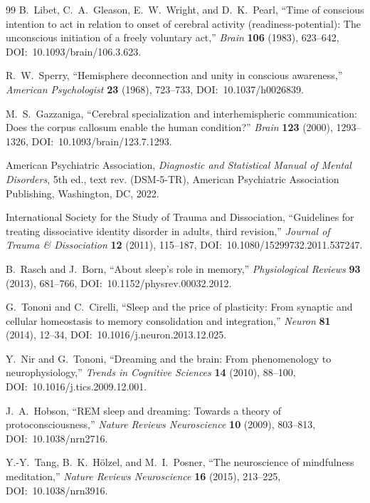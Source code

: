 \documentclass[12pt]{article}
\theoremstyle{definition}
\theoremstyle{remark}
\begin{document}
\begin{thebibliography}{99}
B.~Libet, C.~A.~Gleason, E.~W.~Wright, and D.~K.~Pearl,
``Time of conscious intention to act in relation to onset of cerebral
activity (readiness-potential): The unconscious initiation of a freely
voluntary act,''
\emph{Brain} \textbf{106} (1983), 623--642,
DOI:~10.1093/brain/106.3.623.

R.~W.~Sperry,
``Hemisphere deconnection and unity in conscious awareness,''
\emph{American Psychologist} \textbf{23} (1968), 723--733,
DOI:~10.1037/h0026839.

M.~S.~Gazzaniga,
``Cerebral specialization and interhemispheric communication: Does the
corpus callosum enable the human condition?''
\emph{Brain} \textbf{123} (2000), 1293--1326,
DOI:~10.1093/brain/123.7.1293.

American Psychiatric Association,
\emph{Diagnostic and Statistical Manual of Mental Disorders},
5th ed., text rev. (DSM-5-TR),
American Psychiatric Association Publishing, Washington, DC, 2022.

International Society for the Study of Trauma and Dissociation,
``Guidelines for treating dissociative identity disorder in adults,
third revision,''
\emph{Journal of Trauma \& Dissociation} \textbf{12} (2011), 115--187,
DOI:~10.1080/15299732.2011.537247.

B.~Rasch and J.~Born,
``About sleep's role in memory,''
\emph{Physiological Reviews} \textbf{93} (2013), 681--766,
DOI:~10.1152/physrev.00032.2012.

G.~Tononi and C.~Cirelli,
``Sleep and the price of plasticity: From synaptic and cellular
homeostasis to memory consolidation and integration,''
\emph{Neuron} \textbf{81} (2014), 12--34,
DOI:~10.1016/j.neuron.2013.12.025.

Y.~Nir and G.~Tononi,
``Dreaming and the brain: From phenomenology to neurophysiology,''
\emph{Trends in Cognitive Sciences} \textbf{14} (2010), 88--100,
DOI:~10.1016/j.tics.2009.12.001.

J.~A.~Hobson,
``REM sleep and dreaming: Towards a theory of protoconsciousness,''
\emph{Nature Reviews Neuroscience} \textbf{10} (2009), 803--813,
DOI:~10.1038/nrn2716.

Y.-Y.~Tang, B.~K.~H{\"o}lzel, and M.~I.~Posner,
``The neuroscience of mindfulness meditation,''
\emph{Nature Reviews Neuroscience} \textbf{16} (2015), 213--225,
DOI:~10.1038/nrn3916.


\end{thebibliography}
\end{document}

